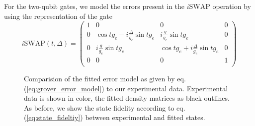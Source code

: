 For the two-qubit gates, we model the errors present in the $i\mathrm{SWAP}$ operation by using the representation of the gate
%
\begin{equation}
i\mathrm{SWAP}(t,\Delta) = \left(
			\begin{array}{cccc}
				1 & 0 & 0 & 0 \\
				0 & \cos{t g_{e}}-i\frac{\Delta}{g_{e}}\sin{t g_{e}} & i \frac{g}{g_e}\sin{t g_{e}} & 0 \\
				0 & i\frac{g}{g_e}\sin{t g_{e}} & \cos{t g_{e}}+i\frac{\Delta}{g_{e}}\sin{t g_{e}} & 0 \\
				0 & 0 & 0 & 1 \\
			\end{array}
	\right) \label{eq:swap_with_detuning}
\end{equation}
%

\begin{figure}
	\centering
	\caption[Comparision of the general error model to our experimental data]{Comparision of the fitted error model as given by eq. (\ref{eq:grover_error_model}) to our experimental data. Experimental data is shown in color, the fitted density matrices as black outlines. As before, we show the state fidelity according to eq. (\ref{eq:state_fideltiy}) between experimental and fitted states.}
	\label{fig:grover_error_model}
\end{figure}

